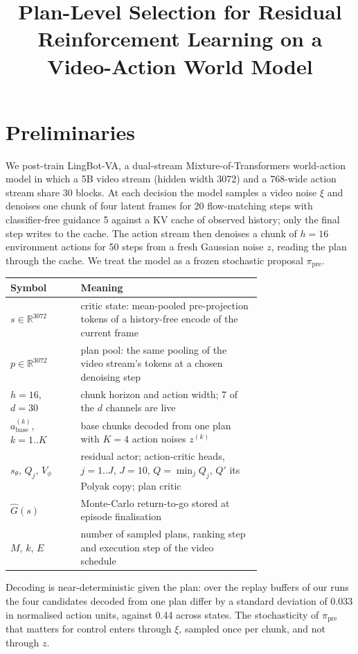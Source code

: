 \documentclass[10pt,twocolumn]{article}
\title{\vspace{-2.5em}Plan-Level Selection for Residual Reinforcement Learning on a Video-Action World Model}
\date{\vspace{-3.5em}}
\begin{document}
\maketitle

\section{Preliminaries}

We post-train LingBot-VA, a dual-stream Mixture-of-Transformers world-action model in which a 5B video stream (hidden width 3072) and a 768-wide action stream share 30 blocks. At each decision the model samples a video noise $\xi$ and denoises one chunk of four latent frames for 20 flow-matching steps with classifier-free guidance 5 against a KV cache of observed history; only the final step writes to the cache. The action stream then denoises a chunk of $h = 16$ environment actions for 50 steps from a fresh Gaussian noise $z$, reading the plan through the cache. We treat the model as a frozen stochastic proposal $\pi_{\mathrm{pre}}$.

\begin{table}[t]
\centering
\small
\begin{tabular}{@{}l p{0.72\linewidth}@{}}
\toprule
Symbol & Meaning \\
\midrule
$s \in \mathbb{R}^{3072}$ & critic state: mean-pooled pre-projection tokens of a history-free encode of the current frame \\
$p \in \mathbb{R}^{3072}$ & plan pool: the same pooling of the video stream's tokens at a chosen denoising step \\
$h = 16$, $d = 30$ & chunk horizon and action width; 7 of the $d$ channels are live \\
$a^{(k)}_{\mathrm{base}}$, $k = 1..K$ & base chunks decoded from one plan with $K = 4$ action noises $z^{(k)}$ \\
$s_\theta$, $Q_j$, $V_\phi$ & residual actor; action-critic heads, $j = 1..J$, $J = 10$, $Q = \min_j Q_j$, $Q'$ its Polyak copy; plan critic \\
$\hat G(s)$ & Monte-Carlo return-to-go stored at episode finalisation \\
$M$, $k$, $E$ & number of sampled plans, ranking step and execution step of the video schedule \\
\bottomrule
\end{tabular}
\end{table}

Decoding is near-deterministic given the plan: over the replay buffers of our runs the four candidates decoded from one plan differ by a standard deviation of 0.033 in normalised action units, against 0.44 across states. The stochasticity of $\pi_{\mathrm{pre}}$ that matters for control enters through $\xi$, sampled once per chunk, and not through $z$.
\end{document}
